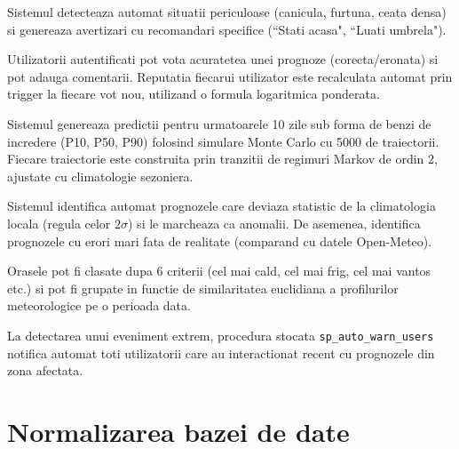 \documentclass[12pt,a4paper]{article}
\begin{document}
\begin{infobox}
Sistemul detecteaza automat situatii periculoase (canicula, furtuna, ceata densa) si genereaza avertizari cu recomandari specifice (``Stati acasa", ``Luati umbrela").
\end{infobox}

\begin{infobox}
Utilizatorii autentificati pot vota acuratetea unei prognoze (corecta/eronata) si pot adauga comentarii. Reputatia fiecarui utilizator este recalculata automat prin trigger la fiecare vot nou, utilizand o formula logaritmica ponderata.
\end{infobox}

\begin{infobox}
Sistemul genereaza predictii pentru urmatoarele 10 zile sub forma de benzi de incredere (P10, P50, P90) folosind simulare Monte Carlo cu 5000 de traiectorii. Fiecare traiectorie este construita prin tranzitii de regimuri Markov de ordin 2, ajustate cu climatologie sezoniera.
\end{infobox}

\begin{infobox}
Sistemul identifica automat prognozele care deviaza statistic de la climatologia locala (regula celor $2\sigma$) si le marcheaza ca anomalii. De asemenea, identifica prognozele cu erori mari fata de realitate (comparand cu datele Open-Meteo).
\end{infobox}

\begin{infobox}
Orasele pot fi clasate dupa 6 criterii (cel mai cald, cel mai frig, cel mai vantos etc.) si pot fi grupate in functie de similaritatea euclidiana a profilurilor meteorologice pe o perioada data.
\end{infobox}

\begin{infobox}
La detectarea unui eveniment extrem, procedura stocata \texttt{sp\_auto\_warn\_users} notifica automat toti utilizatorii care au interactionat recent cu prognozele din zona afectata.
\end{infobox}

\section{Normalizarea bazei de date}
\end{document}

